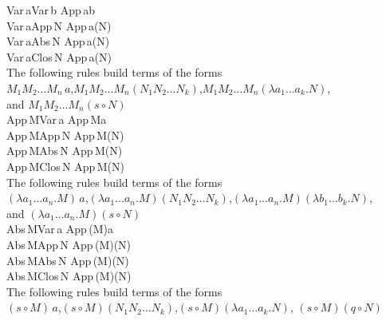 \documentclass[11pt]{amsart}
\def\ruleone#1#2{\prooftree #1 \justifies #2 \endprooftree}
\def\ruletwo#1#2#3{\ruleone{#1\quad #2}{#3}}
\theoremstyle{plain}
\theoremstyle{definition}
\theoremstyle{remark}
\numberwithin{equation}{section}
\newcommand{\ci}{\circ}
\newcommand{\var}{Var\,}
\newcommand{\absterm}{Abs\,}
\newcommand{\appterm}{App\,}
\newcommand{\closterm}{Clos\,}
\begin{document}
\ruletwo{\var a}{\var b}{\appterm  ab}\\[5pt]

\ruletwo{\var a}{\appterm  N}{\appterm  a(N)}\\[5pt]

\ruletwo{\var a}{\absterm  N}{\appterm  a(N)}\\[5pt]

\ruletwo{\var a}{\closterm  N}{\appterm  a(N)}\\[5pt]

The following rules build terms of the forms\\[1pt]
$M_1M_2\ldots M_n \,a$,\quad $M_1M_2\ldots M_n(N_1N_2\ldots
N_k)$,\quad $M_1M_2\ldots M_n(\lambda a_1\ldots a_k.N)$,\\
and  $M_1M_2\ldots M_n(s\ci N)$\\[5pt]


\ruletwo{\appterm  M}{\var a}{\appterm  Ma}\\[5pt]

\ruletwo{\appterm  M}{\appterm  N}{\appterm  M(N)}\\[5pt]

\ruletwo{\appterm  M}{\absterm  N}{\appterm  M(N)}\\[5pt]

\ruletwo{\appterm  M}{\closterm  N}{\appterm  M(N)}\\[5pt]


The following rules build terms of the forms\\[1pt]
$(\lambda a_1\ldots a_n.M)\,a$,\quad $(\lambda a_1\ldots
a_n.M)(N_1N_2\ldots N_k)$,\quad $(\lambda a_1\ldots a_n.M)(\lambda
b_1\ldots b_k.N)$,\\
and $(\lambda a_1 \ldots
a_n.M)(s\ci N)$\\[5pt]

\ruletwo{\absterm  M}{\var a}{\appterm  (M)a}\\[5pt]

\ruletwo{\absterm  M}{\appterm  N}{\appterm  (M)(N)}\\[5pt]

\ruletwo{\absterm  M}{\absterm  N}{\appterm (M)(N)}\\[5pt]

\ruletwo{\absterm  M}{\closterm  N}{\appterm  (M)(N)}\\[5pt]


The following rules build terms of the forms\\[1pt]
$(s\ci M)\,a$,\quad $(s\ci M)(N_1N_2\ldots N_k)$,\quad $(s\ci
M)(\lambda a_1\ldots a_k.N)$,\quad
$(s\ci M)(q\ci N)$\\[5pt]
\end{document}
